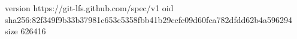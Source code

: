 version https://git-lfs.github.com/spec/v1
oid sha256:82f349f9b33b37981c653c5358fbb41b29ccfc09d60fca782dfdd62b4a596294
size 626416
